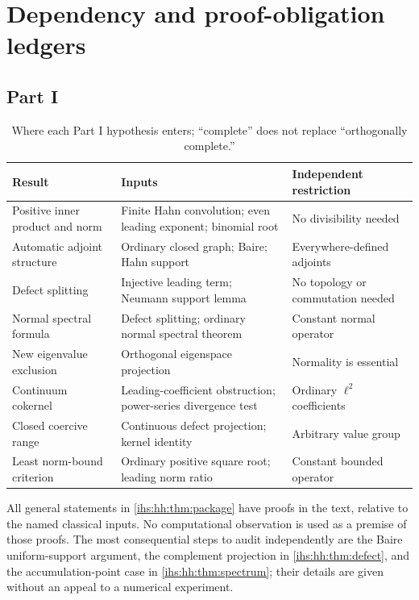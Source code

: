 \documentclass[11pt,a4paper]{article}
\numberwithin{equation}{section}
\theoremstyle{definition}
\theoremstyle{remark}
\begin{document}
\section{Dependency and proof-obligation ledgers}\label{ihs:app:ledgers}

\subsection{Part I}\label{ihs:app:ledgerA}
\begin{table}[ht]
\centering\small
\begin{tabularx}{\textwidth}{@{}p{}YY@{}}
\toprule
Result & Inputs & Independent restriction\\
\midrule
Positive inner product and norm & Finite Hahn convolution; even leading exponent; binomial root & No divisibility needed\\
Automatic adjoint structure & Ordinary closed graph; Baire; Hahn support & Everywhere-defined adjoints\\
Defect splitting & Injective leading term; Neumann support lemma & No topology or commutation needed\\
Normal spectral formula & Defect splitting; ordinary normal spectral theorem & Constant normal operator\\
New eigenvalue exclusion & Orthogonal eigenspace projection & Normality is essential\\
Continuum cokernel & Leading-coefficient obstruction; power-series divergence test & Ordinary $\ell^2$ coefficients\\
Closed coercive range & Continuous defect projection; kernel identity & Arbitrary value group\\
Least norm-bound criterion & Ordinary positive square root; leading norm ratio & Constant bounded operator\\
\bottomrule
\end{tabularx}
\caption{Where each Part I hypothesis enters; ``complete'' does not replace
``orthogonally complete.''}\label{ihs:tab:ledgerA}
\end{table}

All general statements in \cref{ihs:hh:thm:package} have proofs in the text,
relative to the named classical inputs. No computational observation is used
as a premise of those proofs. The most consequential steps to audit
independently are the Baire uniform-support argument, the complement
projection in \cref{ihs:hh:thm:defect}, and the accumulation-point case in
\cref{ihs:hh:thm:spectrum}; their details are given without an appeal to a
numerical experiment.
\end{document}
